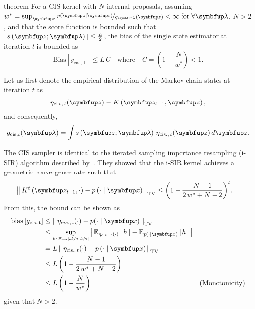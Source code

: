 
\begin{theoremEnd}{theorem}
  For a CIS kernel with \(N\) internal proposals,
  assuming \(w^* = \sup_{\vz} \nicefrac{p\left(\vz\mid\vx\right)}{q_{\vlambda}\left(\vz\right)} < \infty\; \text{for} \; \forall \vlambda \), \(N > 2\), and that the score function is bounded such that \(\left|\,s\left(\vz; \vlambda\right)\,\right| \leq \frac{L}{2}\), the bias of the single state estimator at iteration \(t\) is bounded as
  {\small
  \[
    \mathrm{Bias}\left[ g_{\mathrm{cis.,\, t}} \right] \leq L \, C
    \quad\text{where}\quad C = \left(1 - \frac{N}{w^*}\right) < 1.
  \]
  }
\end{theoremEnd}
%
\begin{proofEnd}
  Let us first denote the empirical distribution of the Markov-chain states at iteration \(t\) as
  \begin{align}
    \eta_{\mathrm{cis.},\, t}(\vz) = K\left(\vz_{t-1}, \vz\right),
  \end{align}
  and consequently,
  \begin{align}
      g_{\mathrm{cis}, t}(\vlambda) = \int s\left(\vz; \vlambda\right) \, \eta_{\mathrm{cis.},\, t}(\vz) \, d\vz.
  \end{align}

  The CIS sampler is identical to the iterated sampling importance resampling (i-SIR) algorithm described by~\citet{andrieu_uniform_2018}.
  They showed that the i-SIR kernel achieves a geometric convergence rate such that
  \begin{align}
    \DTV{K^{t}\left(\vz_{t-1},\cdot\right)}{p\left(\cdot\mid\vx\right)}
    &\leq {\left(1 - \frac{N - 1}{2\,w^* + N - 2}\right)}^t.
  \end{align}
  From this, the bound can be shown as
  \begin{align}
    \mathrm{bias}\left[ g_{\mathrm{cis., t}} \right]
    &\leq \DTV{\eta_{cis.,\, t}(\cdot)}{p(\cdot\mid\vx)} \\
    &\leq \sup_{h : \mathcal{Z} \rightarrow \left[ \text{-}\nicefrac{L}{2}, \nicefrac{L}{2} \right]} \left|\, \Esub{\eta_{\mathrm{cis.},\, t}(\cdot)}{h} - \Esub{p(\cdot\mid\vx)}{h} \,\right| \\
    &= L \, \DTV{ \eta_{\mathrm{cis.},\, t}(\cdot) }{p\left(\cdot\mid\vx\right)}  \\
    &\leq L \, {\left(1 - \frac{N - 1}{2\,w^* + N - 2}\right)} \\
    &\leq L \, {\left(1 - \frac{N}{w^*}\right)} &(\text{Monotonicity})
  \end{align}
  given that \(N > 2\).
\end{proofEnd}

